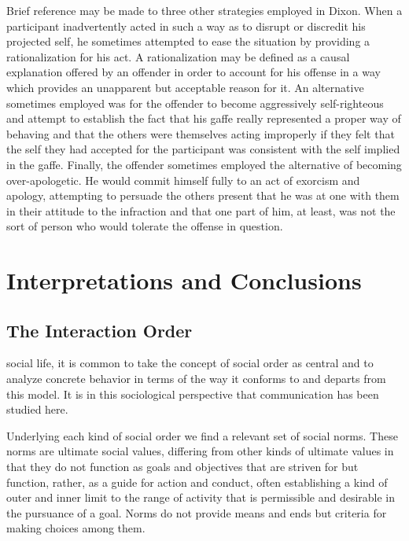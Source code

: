 \documentclass[twoside,symmetric,nobib,justified]{tufte-book}
\let\oldchapter\chapter
\def\chapter{%
  \setcounter{footnote}{0}%
  \oldchapter
}
\begin{document}
Brief reference may be made to three other strategies employed in Dixon.
When a participant inadvertently acted in such a way as to disrupt or
discredit his projected self, he sometimes attempted to ease the
situation by providing a rationalization for his act. A rationalization
may be defined as a causal explanation offered by an offender in order
to account for his offense in a way which provides an unapparent but
acceptable reason for it. An alternative sometimes employed was for the
offender to become aggressively self-righteous and attempt to establish
the fact that his gaffe really represented a proper way of behaving and
that the others were themselves acting improperly if they felt that the
self they had accepted for the participant was consistent with the self
implied in the gaffe. Finally, the offender sometimes employed the
alternative of becoming over-apologetic. He would commit himself fully
to an act of exorcism and apology, attempting to persuade the others
present that he was at one with them in their attitude to the infraction
and that one part of him, at least, was not the sort of person who would
tolerate the offense in question.

\chapter[INTERPRETATIONS AND CONCLUSIONS]{Interpretations and Conclusions}
\label{ch:Interpretations and Conclusions}

\hypertarget{the-interaction-order}{%
\section{The Interaction Order}\label{the-interaction-order}}

 social life, it is common to take the concept of social
order as central and to analyze concrete behavior in terms of the way it
conforms to and departs from this model. It is in this sociological
perspective that communication has been studied here.

Underlying each kind of social order we find a relevant set of social
norms. These norms are ultimate social values, differing from other
kinds of ultimate values in that they do not function as goals and
objectives that are striven for but function, rather, as a guide for
action and conduct, often establishing a kind of outer and inner limit
to the range of activity that is permissible and desirable in the
pursuance of a goal. Norms do not provide means and ends but criteria
for making choices among them.
\end{document}
